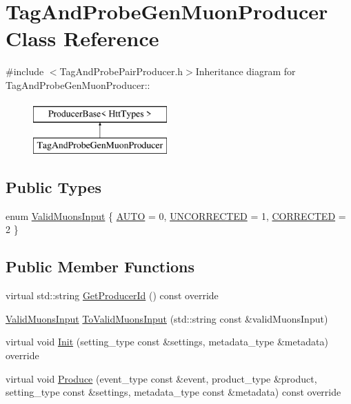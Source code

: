 \hypertarget{classTagAndProbeGenMuonProducer}{
\section{TagAndProbeGenMuonProducer Class Reference}
\label{classTagAndProbeGenMuonProducer}
}


{\ttfamily \#include $<$TagAndProbePairProducer.h$>$}Inheritance diagram for TagAndProbeGenMuonProducer::\begin{figure}[H]
\begin{center}
\leavevmode
\includegraphics[height=2cm]{classTagAndProbeGenMuonProducer}
\end{center}
\end{figure}
\subsection*{Public Types}
\begin{DoxyCompactItemize}
\item 
enum \hyperlink{classTagAndProbeGenMuonProducer_a48aa25cd2668b4b216cde6ed4c806f24}{ValidMuonsInput} \{ \hyperlink{classTagAndProbeGenMuonProducer_a48aa25cd2668b4b216cde6ed4c806f24aef6f69d12769c78518b9b6ad42ac77d3}{AUTO} =  0, 
\hyperlink{classTagAndProbeGenMuonProducer_a48aa25cd2668b4b216cde6ed4c806f24a80a23cfe076051b3e4a7664a3560b5be}{UNCORRECTED} =  1, 
\hyperlink{classTagAndProbeGenMuonProducer_a48aa25cd2668b4b216cde6ed4c806f24a483750a21e7d0fb3c9da9eaaa285d6c3}{CORRECTED} =  2
 \}
\end{DoxyCompactItemize}
\subsection*{Public Member Functions}
\begin{DoxyCompactItemize}
\item 
virtual std::string \hyperlink{classTagAndProbeGenMuonProducer_a4f6033fb83656a1f34de9c1bb8b5135e}{GetProducerId} () const override
\item 
\hyperlink{classTagAndProbeGenMuonProducer_a48aa25cd2668b4b216cde6ed4c806f24}{ValidMuonsInput} \hyperlink{classTagAndProbeGenMuonProducer_a5d38cd666b0311d82decbd85f9600044}{ToValidMuonsInput} (std::string const \&validMuonsInput)
\item 
virtual void \hyperlink{classTagAndProbeGenMuonProducer_a927f39dbd30f06d1befb65c49ed26525}{Init} (setting\_\-type const \&settings, metadata\_\-type \&metadata) override
\item 
virtual void \hyperlink{classTagAndProbeGenMuonProducer_a4517f17b5b9cbabb84dd547f2a43b07f}{Produce} (event\_\-type const \&event, product\_\-type \&product, setting\_\-type const \&settings, metadata\_\-type const \&metadata) const override
\end{DoxyCompactItemize}


